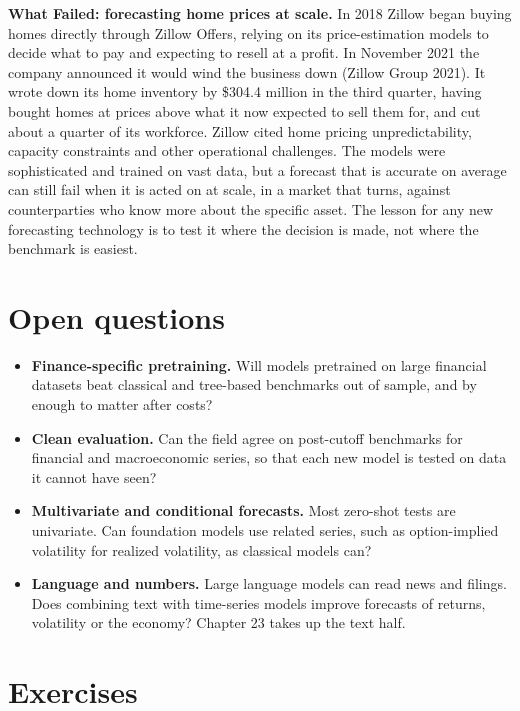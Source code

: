 \begin{callout}
\textbf{What Failed: forecasting home prices at scale.} In 2018 Zillow began buying homes directly through Zillow Offers, relying on its price-estimation models to decide what to pay and expecting to resell at a profit. In November 2021 the company announced it would wind the business down (Zillow Group 2021). It wrote down its home inventory by \$304.4 million in the third quarter, having bought homes at prices above what it now expected to sell them for, and cut about a quarter of its workforce. Zillow cited home pricing unpredictability, capacity constraints and other operational challenges. The models were sophisticated and trained on vast data, but a forecast that is accurate on average can still fail when it is acted on at scale, in a market that turns, against counterparties who know more about the specific asset. The lesson for any new forecasting technology is to test it where the decision is made, not where the benchmark is easiest.
\end{callout}

\section{Open questions}
\label{sec:22-open}

\begin{itemize}
  \item \textbf{Finance-specific pretraining.} Will models pretrained on large financial datasets beat classical and tree-based benchmarks out of sample, and by enough to matter after costs?
  \item \textbf{Clean evaluation.} Can the field agree on post-cutoff benchmarks for financial and macroeconomic series, so that each new model is tested on data it cannot have seen?
  \item \textbf{Multivariate and conditional forecasts.} Most zero-shot tests are univariate. Can foundation models use related series, such as option-implied volatility for realized volatility, as classical models can?
  \item \textbf{Language and numbers.} Large language models can read news and filings. Does combining text with time-series models improve forecasts of returns, volatility or the economy? Chapter 23 takes up the text half.
\end{itemize}

\section*{Exercises}

